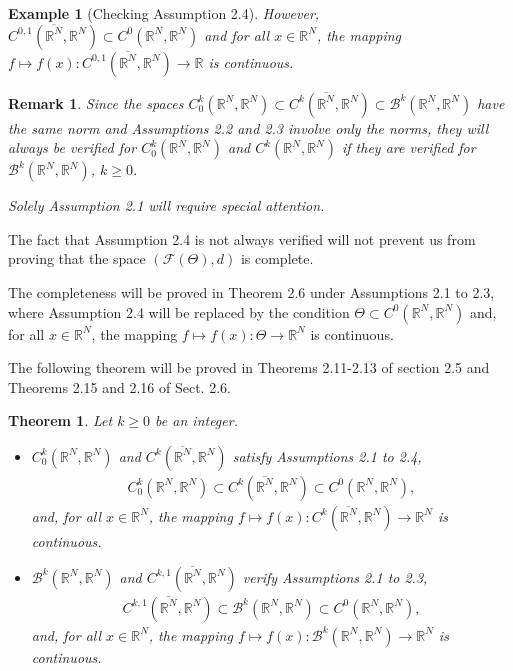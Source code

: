 \documentclass{book}
\numberwithin{equation}{section}
\newtheorem{theorem}{Theorem}[section]
\newtheorem{remark}{Remark}[section]
\newtheorem{example}{Example}[section]
\begin{document}
\begin{enumerate}
\begin{example}[Checking Assumption 2.4]
        However, $C^{0,1}(\overline{\mathbb{R}^N},\mathbb{R}^N)\subset C^0(\mathbb{R}^N,\mathbb{R}^N)$ and for all $x\in\mathbb{R}^N$, the mapping $f\mapsto f(x): C^{0,1}(\overline{\mathbb{R}^N},\mathbb{R}^N)\to\mathbb{R}$ is continuous.
    \end{example}

    \begin{remark}
        Since the spaces $C_0^k(\mathbb{R}^N,\mathbb{R}^N)\subset C^k(\overline{\mathbb{R}^N},\mathbb{R}^N)\subset\mathcal{B}^k(\mathbb{R}^N,\mathbb{R}^N)$ have the same norm and Assumptions 2.2 and 2.3 involve only the norms, they will always be verified for $C_0^k(\mathbb{R}^N,\mathbb{R}^N)$ and $C^k(\mathbb{R}^N,\mathbb{R}^N)$ if they are verified for $\mathcal{B}^k(\mathbb{R}^N,\mathbb{R}^N)$, $k\ge 0$.
        
        Solely Assumption 2.1 will require special attention.
    \end{remark}
    The fact that Assumption 2.4 is not always verified will not prevent us from proving that the space $\left(\mathcal{F}(\Theta),d\right)$ is complete.
    
    The completeness will be proved in Theorem 2.6 under Assumptions 2.1 to 2.3, where Assumption 2.4 will be replaced by the condition $\Theta\subset C^0(\mathbb{R}^N,\mathbb{R}^N)$ and, for all $x\in\mathbb{R}^N$, the mapping $f\mapsto f(x):\Theta\to\mathbb{R}^N$ is continuous.
    
    The following theorem will be proved in Theorems 2.11-2.13 of section 2.5 and Theorems 2.15 and 2.16 of Sect. 2.6.
    
    \begin{theorem}
        Let $k\ge 0$ be an integer.
        \begin{itemize}
            \item[(i)] $C_0^k(\mathbb{R}^N,\mathbb{R}^N)$ and $C^k(\overline{\mathbb{R}^N},\mathbb{R}^N)$ satisfy Assumptions 2.1 to 2.4,
            \begin{align*}
                C_0^k(\mathbb{R}^N,\mathbb{R}^N)\subset C^k(\overline{\mathbb{R}^N},\mathbb{R}^N)\subset C^0(\mathbb{R}^N,\mathbb{R}^N),
            \end{align*}
            and, for all $x\in\mathbb{R}^N$, the mapping $f\mapsto f(x):C^k(\overline{\mathbb{R}^N},\mathbb{R}^N)\to\mathbb{R}^N$ is continuous.
            \item[(ii)] $\mathcal{B}^k(\mathbb{R}^N,\mathbb{R}^N)$ and $C^{k,1}(\overline{\mathbb{R}^N},\mathbb{R}^N)$ verify Assumptions 2.1 to 2.3,
            \begin{align*}
                C^{k,1}(\overline{\mathbb{R}^N},\mathbb{R}^N)\subset\mathcal{B}^k(\mathbb{R}^N,\mathbb{R}^N)\subset C^0(\mathbb{R}^N,\mathbb{R}^N),
            \end{align*}
            and, for all $x\in\mathbb{R}^N$, the mapping $f\mapsto f(x):\mathcal{B}^k(\mathbb{R}^N,\mathbb{R}^N)\to\mathbb{R}^N$ is continuous.
        \end{itemize}
    \end{theorem}
    

\end{enumerate}
\end{document}
